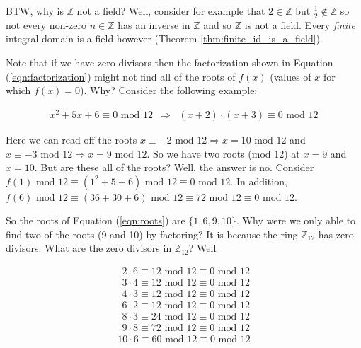 \documentclass[11pt, oneside]{article}   	%
\theoremstyle{definition}
\begin{document}
\bigskip
\noindent
BTW, why is $\mathbb{Z}$ not a field? Well, consider for example
that $2 \in \mathbb{Z}$ but $\frac{1}{2} \notin \mathbb{Z}$ so
not every non-zero $n \in \mathbb{Z}$ has an inverse in
$\mathbb{Z}$ and so $\mathbb{Z}$ is not a field. Every
\emph{finite} integral domain is a field however (Theorem
\ref{thm:finite_id_is_a_field}).

\bigskip
\noindent
Note that if we have zero divisors then the factorization shown
in Equation (\ref{eqn:factorization}) might not find all of the
roots of $f(x)$ (values of $x$ for which $f(x) = 0$). Why?
Consider the following example:

\begin{equation}
\begin{array}{rcll} 
x^2 + 5x + 6 \equiv 0 \text{ mod } 12
&\Rightarrow& (x + 2) \cdot (x + 3) \equiv 0 \text{ mod } 12 
\end{array}
\label{eqn:roots}
\end{equation}

\bigskip
\noindent
Here we can read off the roots $x \equiv -2 \text{ mod } 12
\Rightarrow x = 10 \text{ mod } 12$ and $x \equiv -3 \text{ mod }
12 \Rightarrow x = 9 \text{ mod } 12$. So we have two roots (mod
12) at $x = 9$ and $x = 10$. But are these all of the roots?
Well, the answer is no. Consider $f(1) \text{ mod } 12 \equiv
(1^2 + 5 + 6) \text{ mod } 12 \equiv 0 \text{ mod } 12$. In
addition, $f(6) \text{ mod } 12 \equiv (36 + 30 +6) \text{ mod }
12 \equiv 72 \text{ mod } 12 \equiv 0 \text{ mod } 12$.

\bigskip
\noindent
So the roots of Equation (\ref{eqn:roots}) are $\{1,6,9,10\}$. Why
were we only able to find two of the roots (9 and 10) by
factoring? It is because the ring $\mathbb{Z}_{12}$ has zero
divisors. What are the zero divisors in $\mathbb{Z}_{12}$? Well


\begin{equation}
\begin{array}{lrcll} 
\,\; 2 \cdot 6 \equiv 12 \text{ mod } 12 \equiv 0 \text{ mod } 12 \\
\,\; 3 \cdot 4 \equiv 12 \text{ mod } 12 \equiv 0 \text{ mod } 12 \\
\,\; 4 \cdot 3 \equiv 12 \text{ mod } 12 \equiv 0 \text{ mod } 12 \\
\,\; 6 \cdot 2 \equiv 12 \text{ mod } 12 \equiv 0 \text{ mod } 12 \\
\,\; 8 \cdot 3 \equiv 24 \text{ mod } 12 \equiv 0 \text{ mod } 12 \\
\,\; 9 \cdot 8 \equiv 72 \text{ mod } 12 \equiv 0 \text{ mod } 12 \\
    10 \cdot 6 \equiv 60 \text{ mod } 12 \equiv 0 \text{ mod } 12 \\
\end{array}
\end{equation}
\end{document}
